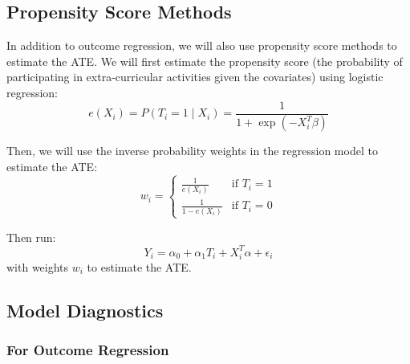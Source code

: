 \documentclass[11pt]{article}
\begin{document}
\subsection{Propensity Score Methods}

In addition to outcome regression, we will also use propensity score methods to estimate the ATE. We will first estimate the propensity score (the probability of participating in extra-curricular activities given the covariates) using logistic regression:
\begin{equation*}
e(X_i) = P(T_i = 1 \mid X_i) = \frac{1}{1 + \exp(-X_i^T \beta)}
\end{equation*}

Then, we will use the inverse probability weights in the regression model to estimate the ATE:
\begin{equation*}
    w_i = \begin{cases}
    \frac{1}{e(X_i)} & \text{if } T_i = 1 \\
    \frac{1}{1 - e(X_i)} & \text{if } T_i = 0
    \end{cases}
\end{equation*}

Then run:
\begin{equation*}
Y_i = \alpha_0 + \alpha_1 T_i + X_i^T \alpha + \epsilon_i
\end{equation*}
with weights $w_i$ to estimate the ATE.


\subsection{Model Diagnostics}

\subsubsection{For Outcome Regression}
\end{document}
